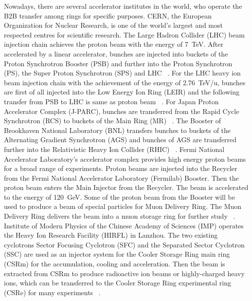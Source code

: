%

Nowadays, there are several accelerator institutes in the world, who operate the B2B transfer among rings for specific purposes. 
\gls{CERN}, the European Organization for Nuclear Research, is one of the world's largest and most respected centres for scientific research. The Large Hadron Collider (\gls{LHC}) beam injection chain achieves the proton beam with the energy of \SI{7}{TeV}. After accelerated by a linear accelerator, bunches are injected into buckets of the Proton Synchrotron Booster (\gls{PSB}) and further into the Proton Synchrotron (\gls{PS}), the Super Proton Synchrotron (\gls{SPS}) and LHC ~\cite{ferrand_synchronization_2015}. For the LHC heavy ion beam injection chain with the achievement of the energy of \SI{2.76}{TeV/u}, bunches are first of all injected into the Low Energy Ion Ring (\gls{LEIR}) and the following transfer from PSB to LHC is same as proton beam ~\cite{ferrand_synchronization_2015}. For Japan Proton Accelerator Complex (\gls{J-PARC}), bunches are transferred from the Rapid Cycle Synchrotron (\gls{RCS}) to buckets of the Main Ring (\gls{MR}) ~\cite{_j-parc_????}. The Booster of Brookhaven National Laboratory (\gls{BNL}) transfers bunches to buckets of the Alternating Gradient Synchrotron (\gls{AGS}) and bunches of AGS are transferred further into the Relativistic Heavy Ion Collider (\gls{RHIC}) ~\cite{_brookhaven_????}. Fermi National Accelerator Laboratory's accelerator complex provides high energy proton beams for a broad range of experiments. Proton beams are injected into the Recycler from the Fermi National Accelerator Laboratory (\gls{Fermilab}) Booster. Then the proton beam enters the Main Injector from the Recycler. The beam is accelerated to the energy of \SI{120}{GeV}. Some of the proton beam from the Booster will be used to produce a beam of special particles for Muon Delivery Ring. The Muon Delivery Ring delivers the beam into a muon storage ring for further study ~\cite{_fermi_????}. Institute of Modern Physics of the Chinese Academy of Sciences (\gls{IMP}) operates the Heavy Ion Research Facility (\gls{HIRFL}) in Lanzhou. The two existing cyclotrons Sector Focusing Cyclotron (\gls{SFC}) and the Separated Sector Cyclotron (\gls{SSC}) are used as an injector system for the Cooler Storage Ring main ring (\gls{CSRm}) for the accumulation, cooling and acceleration. Then the beam is extracted from CSRm to produce radioactive ion beams or highly-charged heavy ions, which can be transferred to the Cooler Storage Ring experimental ring (\gls{CSRe}) for many experiments ~\cite{_institute_????, man_survey_2002}.  

